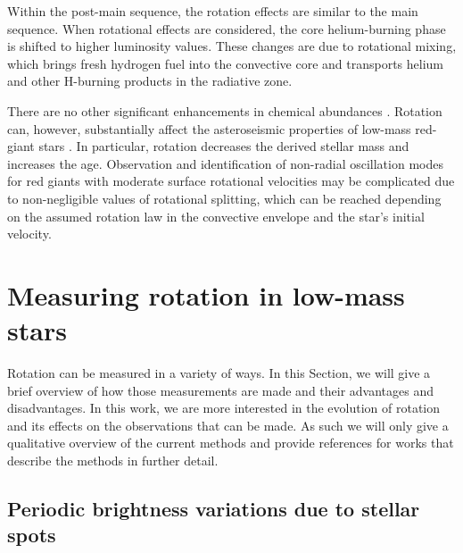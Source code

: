 Within the post-main sequence, the rotation effects are similar to the main sequence.
When rotational effects are considered, the core helium-burning phase is shifted to higher luminosity values. 
These changes are due to rotational mixing, which brings fresh hydrogen fuel into the convective core and transports helium and other H-burning products in the radiative zone.

There are no other significant enhancements in chemical abundances \citep[see Table 2 in][]{lagarde_thermohaline_2012}.
Rotation can, however, substantially affect the asteroseismic properties of low-mass red-giant stars \citep{lagarde_thermohaline_2012, eggenberger_effects_2010}.
In particular, rotation decreases the derived stellar mass and increases the age.
Observation and identification of non-radial oscillation modes for red giants with moderate surface rotational velocities may be complicated due to non-negligible values of rotational splitting, which can be reached depending on the assumed rotation law in the convective envelope and the star's initial velocity.

\section{Measuring rotation in low-mass stars}
\label{sec:techniques}


Rotation can be measured in a variety of ways.
In this Section, we will give a brief overview of how those measurements are made and their advantages and disadvantages.
In this work, we are more interested in the evolution of rotation and its effects on the observations that can be made.
As such we will only give a qualitative overview of the current methods and provide references for works that describe the methods in further detail.

\subsection{Periodic brightness variations due to stellar spots}
\label{sec:periodic_brightness_meas}

